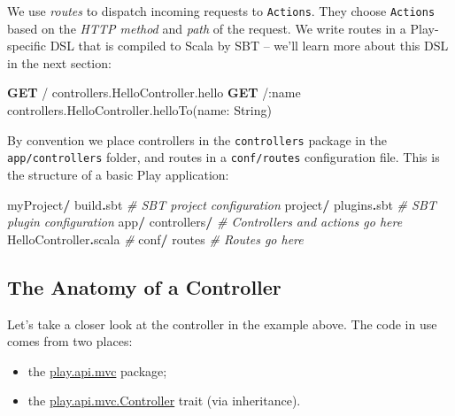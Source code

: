 \documentclass[oneside,11pt,a4paper,]{book}
\newenvironment{Shaded}{\begin{snugshade}}{\end{snugshade}}
\newcommand{\KeywordTok}[1]{\textcolor[rgb]{0.13,0.29,0.53}{\textbf{{#1}}}}
\newcommand{\CommentTok}[1]{\textcolor[rgb]{0.56,0.35,0.01}{\textit{{#1}}}}
\newcommand{\NormalTok}[1]{{#1}}
\begin{document}
We use \emph{routes} to dispatch incoming requests to \texttt{Actions}.
They choose \texttt{Actions} based on the \emph{HTTP method} and
\emph{path} of the request. We write routes in a Play-specific DSL that
is compiled to Scala by SBT -- we'll learn more about this DSL in the
next section:

\begin{Shaded}
\begin{Highlighting}[]
\KeywordTok{GET} \NormalTok{/      controllers.HelloController.hello}
\KeywordTok{GET} \NormalTok{/:name controllers.HelloController.helloTo(name: String)}
\end{Highlighting}
\end{Shaded}

By convention we place controllers in the \texttt{controllers} package
in the \texttt{app/controllers} folder, and routes in a
\texttt{conf/routes} configuration file. This is the structure of a
basic Play application:

\begin{Shaded}
\begin{Highlighting}[]
\NormalTok{myProject}\KeywordTok{/}
  \NormalTok{build}\KeywordTok{.}\NormalTok{sbt                 }\CommentTok{# SBT project configuration}
  \NormalTok{project}\KeywordTok{/}
    \NormalTok{plugins}\KeywordTok{.}\NormalTok{sbt             }\CommentTok{# SBT plugin configuration}
  \NormalTok{app}\KeywordTok{/}
    \NormalTok{controllers}\KeywordTok{/}            \CommentTok{# Controllers and actions go here}
      \NormalTok{HelloController}\KeywordTok{.}\NormalTok{scala }\CommentTok{#}
  \NormalTok{conf}\KeywordTok{/}
    \NormalTok{routes                  }\CommentTok{# Routes go here}
\end{Highlighting}
\end{Shaded}

\subsection{The Anatomy of a
Controller}\label{the-anatomy-of-a-controller}

Let's take a closer look at the controller in the example above. The
code in use comes from two places:

\begin{itemize}
\itemsep1pt\parskip0pt
\item
  the
  \href{https://www.playframework.com/documentation/2.3.x/api/scala/index.html\#play.api.mvc.package}{play.api.mvc}
  package;
\item
  the
  \href{https://www.playframework.com/documentation/2.3.x/api/scala/index.html\#play.api.mvc.Controller}{play.api.mvc.Controller}
  trait (via inheritance).
\end{itemize}
\end{document}
